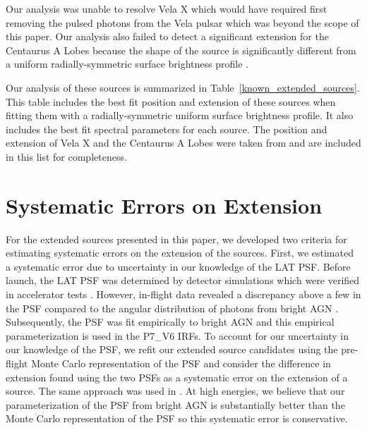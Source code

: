 \documentclass[12pt,preprint]{aastex}
\newcommand{\gev}{\text{GeV}\xspace}
\begin{document}
Our analysis was unable to resolve Vela X which would have required first
removing the pulsed photons from the Vela pulsar which was beyond the
scope of this paper.  Our analysis also failed to detect a significant
extension for the Centaurus A Lobes because
the shape of the source is significantly different from a uniform
radially-symmetric surface brightness profile \citep{cen_a_lat}.

Our analysis of these sources is summarized in
Table~\ref{known_extended_sources}.  This table includes the best fit
position and extension of these sources when fitting them 
with a radially-symmetric uniform surface brightness profile. It also
includes the best fit spectral parameters for each source.  The position
and extension of Vela X and the Centaurus A Lobes were taken from
\cite{velax,cen_a_lat} and are included in this list for completeness.

\section{Systematic Errors on Extension}
\label{systematic_errors_on_extension}


For the extended sources presented in this paper,
we developed two criteria for estimating systematic errors
on the extension of the sources.
First, we estimated a systematic error due to
uncertainty in our knowledge of the LAT PSF.  
Before launch, the LAT PSF
was determined by detector simulations which were verified in accelerator
tests \citep{atwood_LAT_mission}. However, in-flight data revealed
a discrepancy above a few \gev in the PSF compared to the angular
distribution of photons from bright AGN \citep{lat_on_orbit_psf}.
Subsequently, the PSF was fit empirically to bright AGN and this
empirical parameterization is used in the P7\_V6 IRFs.  To account for
our uncertainty in our knowledge of the PSF, we refit our extended source
candidates using the pre-flight Monte Carlo representation of the PSF
and consider the difference in extension found using the two PSFs as a
systematic error on the extension of a source.  The same approach was used
in \cite{ic443}.  At high energies, we believe that our parameterization
of the PSF from bright AGN is substantially better than the Monte Carlo
representation of the PSF so this systematic error is conservative.

\end{document}
